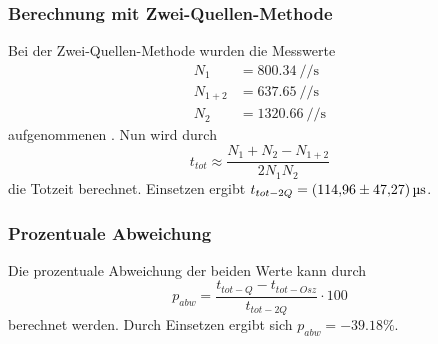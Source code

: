 \subsubsection*{Berechnung mit Zwei-Quellen-Methode}
        Bei der Zwei-Quellen-Methode wurden die Messwerte
        \begin{align*}
            N_1 &= \SI{800.34}{\per\per\second}\\ %
            N_{1+2} &= \SI{637.65}{\per\per\second}\\
            N_2 &= \SI{1320.66}{\per\per\second}
        \end{align*}
        aufgenommenen \cite{AP02}. Nun wird durch 
        \begin{equation*}
            t_{tot}\approx \frac{N_1+N_2-N_{1+2}}{2N_1N_2}
        \end{equation*}
        die Totzeit berechnet. Einsetzen ergibt $t_{tot-2Q}=\SI{114.96 \pm 47.27}{\micro\second}$.
\subsubsection*{Prozentuale Abweichung}
Die prozentuale Abweichung der beiden Werte kann durch 
\begin{equation}
    p_{abw}=\frac{t_{tot-Q}-t_{tot-Osz}}{t_{tot-2Q}}\cdot 100
\end{equation}
berechnet werden. Durch Einsetzen ergibt sich $p_{abw}=\num{-39.18}\%$.

